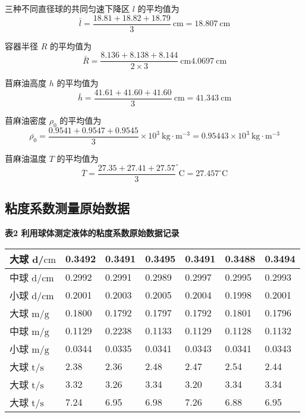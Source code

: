 \documentclass[10pt,a4paper]{article}	%
\makeatletter
\newenvironment{tablehere}
{\def\@captype{table}}
{}
\makeatother
\begin{document}
	三种不同直径球的共同匀速下降区 $l$ 的平均值为
	$$
	\bar{l}=\frac{18.81+18.82+18.79}{3} \mathrm{~cm}=18.807 \mathrm{~cm}
	$$

	容器半径 $R$ 的平均值为
	$$
	\bar{R}=\frac{8.136+8.138+8.144}{2 \times 3} \mathrm{~cm}4.0697 \mathrm{~cm}
	$$

	苜麻油高度 $h$ 的平均值为
	$$
	\bar{h}=\frac{41.61+41.60+41.60}{3} \mathrm{~cm}=41.343 \mathrm{~cm}
	$$

	苜麻油密度 $\rho_0$ 的平均值为
	$$
	\overline{\rho_0}=\frac{0.9541+0.9547+0.9545}{3} \times 10^3 \mathrm{~kg} \cdot \mathrm{m}^{-3}=0.95443 \times 10^3 \mathrm{~kg} \cdot \mathrm{m}^{-3}
	$$

	苜麻油温度 $T$ 的平均值为	
	$$
	\overline{T}=\frac{27.35+27.41+27.57}{3} ^\circ \mathrm{C} = 27.457 ^\circ \mathrm{C}
	$$

\newpage

	\subsection{粘度系数测量原始数据}

	\begin{tablehere}
		\caption*{\bf 表2 利用球体测定液体的粘度系数原始数据记录}
		\noindent
		\begin{center}
			\begin{tabularx}{0.95\linewidth}{|Y|Y|Y|Y|Y|Y|Y|}
				\hline
				大球 d/$\mathrm {cm}$ & 0.3492 & 0.3491 & 0.3495 & 0.3491 & 0.3488 & 0.3494 \\ \hline
				中球 d/$\mathrm {cm}$ & 0.2992 & 0.2991 & 0.2989 & 0.2997 & 0.2995 & 0.2993 \\ \hline
				小球 d/$\mathrm {cm}$ & 0.2001 & 0.2003 & 0.2005 & 0.2004 & 0.1998 & 0.2001 \\ \hline
				大球 m/$\mathrm {g}$  & 0.1800 & 0.1792 & 0.1797 & 0.1792 & 0.1801 & 0.1796 \\ \hline
				中球 m/$\mathrm {g}$  & 0.1129 & 0.2238 & 0.1133 & 0.1129 & 0.1128 & 0.1132 \\ \hline
				小球 m/$\mathrm {g}$  & 0.0344 & 0.0335 & 0.0341 & 0.0343 & 0.0341 & 0.0343 \\ \hline
				大球 t/$\mathrm {s}$  & 2.38   & 2.36   & 2.48   & 2.47   & 2.54   & 2.44   \\ \hline
				大球 t/$\mathrm {s}$  & 3.32   & 3.26   & 3.34   & 3.20   & 3.34   & 3.34   \\ \hline
				大球 t/$\mathrm {s}$  & 7.24   & 6.95   & 6.98   & 7.26   & 6.88   & 6.95   \\ \hline
			\end{tabularx}
		\end{center}
		\vspace*{1em}
	\end{tablehere}
\end{document}
